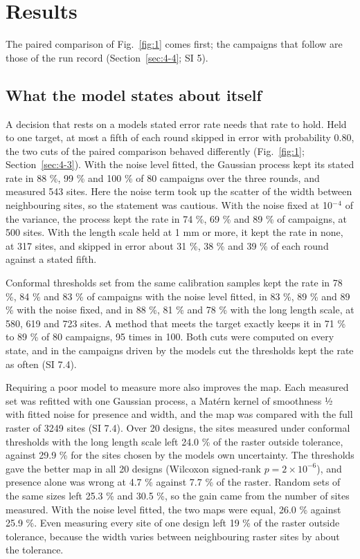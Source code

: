 \documentclass{iopjournal}
\begin{document}
\hypertarget{sec:5}{%
\section{Results}\label{sec:5}}

The paired comparison of Fig.~\ref{fig:1} comes first; the campaigns that follow are those of the run record (Section~\ref{sec:4-4}; SI 5).

\hypertarget{sec:5-1}{%
\subsection{What the model states about itself}\label{sec:5-1}}

A decision that rests on a model\textquotesingle s stated error rate needs that rate to hold. Held to one target, at most a fifth of each round skipped in error with probability 0.80, the two cuts of the paired comparison behaved differently (Fig.~\ref{fig:1}; Section~\ref{sec:4-3}). With the noise level fitted, the Gaussian process kept its stated rate in 88 \%, 99 \% and 100 \% of 80 campaigns over the three rounds, and measured 543 sites. Here the noise term took up the scatter of the width between neighbouring sites, so the statement was cautious. With the noise fixed at 10\ensuremath{^{-}}\ensuremath{^{4}} of the variance, the process kept the rate in 74 \%, 69 \% and 89 \% of campaigns, at 500 sites. With the length scale held at 1 mm or more, it kept the rate in none, at 317 sites, and skipped in error about 31 \%, 38 \% and 39 \% of each round against a stated fifth.

Conformal thresholds set from the same calibration samples kept the rate in 78 \%, 84 \% and 83 \% of campaigns with the noise level fitted, in 83 \%, 89 \% and 89 \% with the noise fixed, and in 88 \%, 81 \% and 78 \% with the long length scale, at 580, 619 and 723 sites. A method that meets the target exactly keeps it in 71 \% to 89 \% of 80 campaigns, 95 times in 100. Both cuts were computed on every state, and in the campaigns driven by the model\textquotesingle s cut the thresholds kept the rate as often (SI 7.4).

Requiring a poor model to measure more also improves the map. Each measured set was refitted with one Gaussian process, a Matérn kernel of smoothness ½ with fitted noise for presence and width, and the map was compared with the full raster of 3249 sites (SI 7.4). Over 20 designs, the sites measured under conformal thresholds with the long length scale left 24.0 \% of the raster outside tolerance, against 29.9 \% for the sites chosen by the model\textquotesingle s own uncertainty. The thresholds gave the better map in all 20 designs (Wilcoxon signed-rank \(p = 2 \times 10^{-6}\)), and presence alone was wrong at 4.7 \% against 7.7 \% of the raster. Random sets of the same sizes left 25.3 \% and 30.5 \%, so the gain came from the number of sites measured. With the noise level fitted, the two maps were equal, 26.0 \% against 25.9 \%. Even measuring every site of one design left 19 \% of the raster outside tolerance, because the width varies between neighbouring raster sites by about the tolerance.
\end{document}
